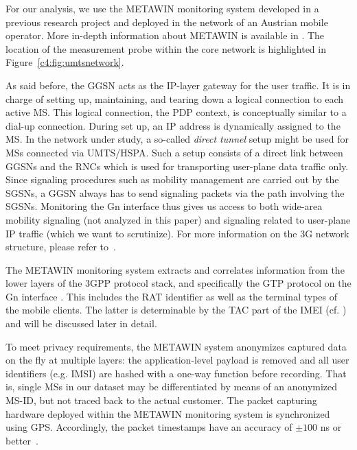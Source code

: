 For our analysis, we use the \gls{METAWIN} monitoring system developed in a previous research project
and deployed in the network of an Austrian mobile operator.  More in-depth information about \gls{METAWIN} is available in \cite{ricciato_2011}.
The location of the measurement probe within the core network is highlighted in Figure~\ref{c4:fig:umtsnetwork}. 

As said before, the \gls{GGSN} acts as the IP-layer gateway for the user traffic. It is in charge of setting up,
maintaining, and tearing down a logical connection to each active \gls{MS}. This logical connection, the \gls{PDP} context,
is conceptually similar to a dial-up connection. During set up, an
IP address is dynamically assigned to the \gls{MS}.
In the network under study, a so-called \textit{direct tunnel} setup might be used for \glspl{MS} connected
via \gls{UMTS}/\gls{HSPA}. Such a setup consists of a direct link between \glspl{GGSN} and the
\glspl{RNC} %
which is used for
transporting user-plane data traffic only. Since signaling procedures such
as mobility management are carried out by the \glspl{SGSN}, a \gls{GGSN} always has to send signaling packets
via the path involving the \glspl{SGSN}. Monitoring the Gn interface thus gives us access to both wide-area mobility signaling (not analyzed in this paper) %
and signaling related to user-plane IP traffic (which we want to scrutinize).
For more information on the \gls{3G} network structure, please refer to~\cite{bannister_convergence_2004}.

The METAWIN monitoring system extracts and correlates information from the lower
layers of the \gls{3GPP} protocol stack, and specifically the \gls{GTP} protocol
on the Gn interface \cite{3gpp129.060}. This includes the \acrfull{RAT} identifier as well as the terminal types of the mobile clients. The
latter is determinable by the \acrfull{TAC} part of the \acrfull{IMEI} (cf. \cite{3gpp23.003}) and will be discussed later in detail.

To meet privacy requirements, the METAWIN system anonymizes captured data on the fly at multiple
layers: the application-level payload is removed and all user identifiers (e.g. \gls{IMSI}) are
hashed with a one-way function before recording. That is, single
\glspl{MS} in our dataset may be differentiated by means of an anonymized \gls{MS-ID}, but not traced back to the actual customer.
The packet capturing hardware deployed within the METAWIN monitoring system is synchronized
using \gls{GPS}. Accordingly, the packet timestamps
have an accuracy of $\pm100$ ns or better~\cite[p.97-98]{donnelly_high_2002}.



